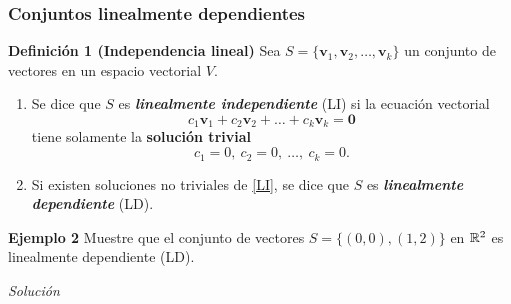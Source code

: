 {\nologo
\begin{frame}\frametitle{Conjuntos linealmente dependientes}

\vspace{-2mm}
\begin{block}{\textbf{Definición 1 (Independencia lineal)}}
	\justifying
	Sea $S=\{\mathbf{v}_1,\mathbf{v}_2,\hdots,\mathbf{v}_k\}$ un conjunto de vectores
	en un espacio vectorial $V$.
	
	\begin{enumerate}%
		\item[\labelname{$a$}] Se dice que $S$ es \textbf{\textit{linealmente independiente}} (LI) si
		la ecuación vectorial
		\begin{equation}\tag{1}
		c_1\mathbf{v}_1+c_2\mathbf{v}_2+\hdots+c_k\mathbf{v}_k = \mathbf{0}
		\end{equation}
		tiene solamente la \textbf{solución trivial}
		\[
		c_1 =0,\ c_2 =0,\ \hdots,\ c_k=0.
		\]
		
		\item[\labelname{$b$}] Si existen soluciones no triviales de \eqref{LI}, se dice que $S$ es \textbf{\textit{linealmente dependiente}} (LD).
	\end{enumerate}		
\end{block}

\begin{ej}{\textbf{Ejemplo 2}} \justifying
	Muestre que el conjunto de vectores $S=\{ (0,0), (1,2) \}$ en $\mathbb{R}^2$ es linealmente dependiente (LD).
\end{ej}	
\textit{Solución}

\end{frame}
}




\subsection{}

